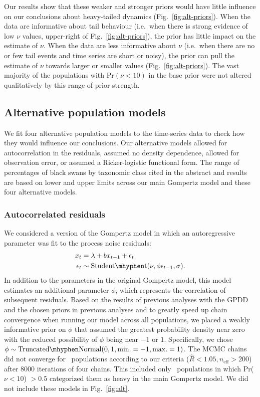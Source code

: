 Our results show that these weaker and stronger priors would have little
influence on our conclusions about heavy-tailed dynamics
(Fig.~\ref{fig:alt-priors}). When the data are informative about tail
behaviour (i.e.\ when there is strong evidence of low $\nu$ values,
upper-right of Fig.~\ref{fig:alt-priors}), the prior has little impact on the
estimate of $\nu$. When the data are less informative about $\nu$ (i.e.\ when
there are no or few tail events and time series are short or noisy), the prior
can pull the estimate of $\nu$ towards larger or smaller values
(Fig.~\ref{fig:alt-priors}). The vast majority of the populations with Pr$(\nu
< 10)$ in the base prior were not altered qualitatively by this range of prior
strength.

\subsection{Alternative population models}

We fit four alternative population models to the time-series data to check how
they would influence our conclusions. Our alternative models allowed for
autocorrelation in the residuals, assumed no density dependence, allowed for
observation error, or assumed a Ricker-logistic functional form. The range of
percentages of black swans by taxonomic class cited in the abstract and
results are based on lower and upper limits across our main Gompertz model and
these four alternative models.

\subsubsection{Autocorrelated residuals}

We considered a version of the Gompertz model in which an autoregressive
parameter was fit to the process noise residuals:
\begin{align*}
x_t &= \lambda + b x_{t-1} + \epsilon_t\\
\epsilon_t &\sim \mathrm{Student\mhyphen t}(\nu, \phi \epsilon_{t-1}, \sigma).
\end{align*}
In addition to the parameters in the original Gompertz model, this model
estimates an additional parameter $\phi$, which represents the correlation of
subsequent residuals. Based on the results of previous analyses with the GPDD
\citep[e.g.][]{connors2014} and the chosen priors in previous analyses
\citep[e.g.][]{thorson2014a} and to greatly speed up chain convergence when
running our model across all populations, we placed a weakly informative prior
on $\phi$ that assumed the greatest probability density near zero with the
reduced possibility of $\phi$ being near $-1$ or $1$. Specifically, we chose
$\phi \sim \mathrm{Truncated\mhyphen Normal}(0, 1, \mathrm{min.} = -1,
\mathrm{max.} = 1)$. The MCMC chains did not converge for
\modelsNoConvergeAROne\ populations according to our criteria ($\widehat{R} <
1.05, n_\mathrm{eff} > 200$) after 8000 iterations of four chains. This
  included only \modelsNoConvergeAROneHeavyBase\ populations in which Pr($\nu
  < 10$) $> 0.5$ categorized them as heavy in the main Gompertz model. We did
  not include these models in Fig.~\ref{fig:alt}.

